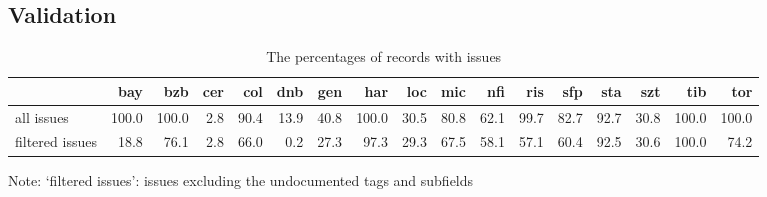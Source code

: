 \subsection{Validation}

\begin{table*}
\caption{The percentages of records with issues}
\label{tab:proportion-of-issues}
\begin{minipage}{17.5cm} %
\begin{center}
\begin{tabular}{lrrrrrrrrrrrrrrrr}
  \toprule
    & bay & bzb & cer & col & dnb & gen & har & loc & mic & nfi & ris & sfp & sta & szt & tib & tor \\
  \midrule
all issues & 100.0 & 100.0 & 2.8 & 90.4 & 13.9 & 40.8 & 100.0 & 30.5 & 80.8 & 62.1 & 99.7 & 82.7 & 92.7 & 30.8 & 100.0 & 100.0 \\
filtered issues & 18.8 & 76.1 & 2.8 & 66.0 & 0.2 & 27.3 & 97.3 & 29.3 & 67.5 & 58.1 & 57.1 & 60.4 & 92.5 & 30.6 & 100.0 & 74.2 \\
  \bottomrule
\end{tabular}
\end{center}
\footnotesize
Note: `filtered issues': issues excluding the undocumented tags and subfields
\end{minipage}
\end{table*}

